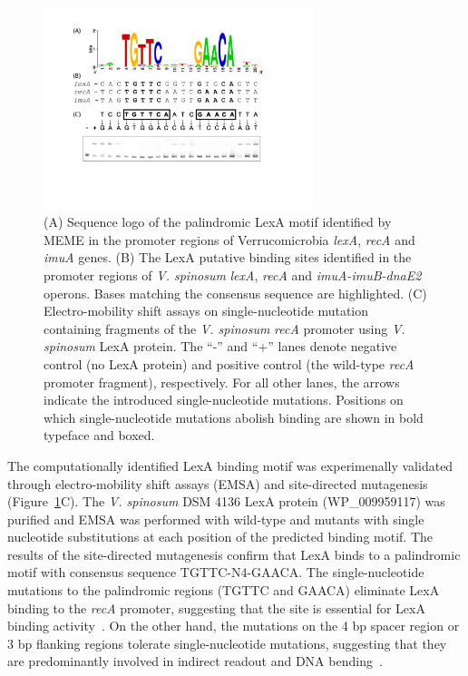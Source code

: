 \begin{figure}
  \centering
  \includegraphics[width=0.7\textwidth]{figures/chapter5/verruco_lexa}
  \caption[(A) Sequence logo of the palindromic LexA motif identified by MEME
  in the promoter regions of Verrucomicrobia \textit{lexA}, \textit{recA} and
  \textit{imuA} genes. (B) The LexA putative binding sites identified in the
  promoter regions of \textit{V. spinosum} \textit{lexA}, \textit{recA} and
  \textit{imuA-imuB-dnaE2} operons.]{(A) Sequence logo of the palindromic LexA
    motif identified by MEME in the promoter regions of Verrucomicrobia
    \textit{lexA}, \textit{recA} and \textit{imuA} genes. (B) The LexA putative
    binding sites identified in the promoter regions of \textit{V. spinosum}
    \textit{lexA}, \textit{recA} and \textit{imuA-imuB-dnaE2} operons. Bases
    matching the consensus sequence are highlighted. (C) Electro-mobility shift
    assays on single-nucleotide mutation containing fragments of the
    \textit{V. spinosum} \textit{recA} promoter using \textit{V. spinosum} LexA
    protein. The ``-'' and ``+'' lanes denote negative control (no LexA
    protein) and positive control (the wild-type \textit{recA} promoter
    fragment), respectively. For all other lanes, the arrows indicate the
    introduced single-nucleotide mutations. Positions on which
    single-nucleotide mutations abolish binding are shown in bold typeface and
    boxed.}
  \label{fig:verruco-lexa}
\end{figure}

The computationally identified LexA binding motif was experimenally validated
through electro-mobility shift assays (EMSA) and site-directed mutagenesis
(Figure~\ref{fig:verruco-lexa}C). The \textit{V. spinosum} DSM 4136
LexA protein (WP\_009959117) was purified and EMSA was performed with wild-type
and mutants with single nucleotide substitutions at each position of the
predicted binding motif. The results of the site-directed mutagenesis confirm
that LexA binds to a palindromic motif with consensus sequence
TGTTC-N4-GAACA\@. The single-nucleotide mutations to the palindromic regions
(TGTTC and GAACA) eliminate LexA binding to the \textit{recA} promoter,
suggesting that the site is essential for LexA binding
activity~\citep{groban2005binding}. On the other hand, the mutations on the 4 bp
spacer region or 3 bp flanking regions tolerate single-nucleotide mutations,
suggesting that they are predominantly involved in indirect readout and DNA
bending~\citep{zhang2010structure}.

